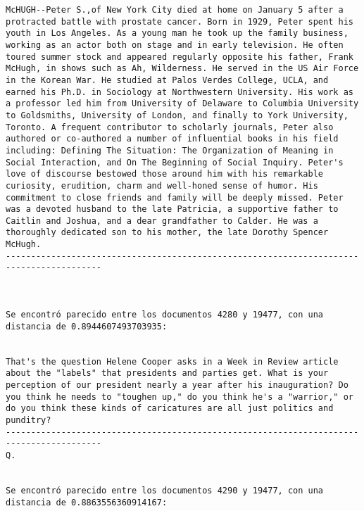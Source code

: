 \documentclass[11pt]{article}
\begin{document}
\begin{Verbatim}[commandchars=\\\{\}]
McHUGH--Peter S.,of New York City died at home on January 5 after a protracted battle with prostate cancer. Born in 1929, Peter spent his youth in Los Angeles. As a young man he took up the family business, working as an actor both on stage and in early television. He often toured summer stock and appeared regularly opposite his father, Frank McHugh, in shows such as Ah, Wilderness. He served in the US Air Force in the Korean War. He studied at Palos Verdes College, UCLA, and earned his Ph.D. in Sociology at Northwestern University. His work as a professor led him from University of Delaware to Columbia University to Goldsmiths, University of London, and finally to York University, Toronto. A frequent contributor to scholarly journals, Peter also authored or co-authored a number of influential books in his field including: Defining The Situation: The Organization of Meaning in Social Interaction, and On The Beginning of Social Inquiry. Peter's love of discourse bestowed those around him with his remarkable curiosity, erudition, charm and well-honed sense of humor. His commitment to close friends and family will be deeply missed. Peter was a devoted husband to the late Patricia, a supportive father to Caitlin and Joshua, and a dear grandfather to Calder. He was a thoroughly dedicated son to his mother, the late Dorothy Spencer McHugh.
-----------------------------------------------------------------------------------------



Se encontró parecido entre los documentos 4280 y 19477, con una distancia de 0.8944607493703935:


That's the question Helene Cooper asks in a Week in Review article about the "labels" that presidents and parties get. What is your perception of our president nearly a year after his inauguration? Do you think he needs to "toughen up," do you think he's a "warrior," or do you think these kinds of caricatures are all just politics and punditry?
-----------------------------------------------------------------------------------------
Q.


Se encontró parecido entre los documentos 4290 y 19477, con una distancia de 0.8863556360914167:



\end{Verbatim}
\end{document}
